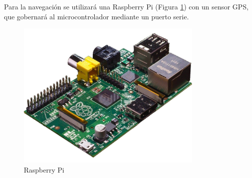 \documentclass[12pt,twoside]{article}
\begin{document}
		Para la navegación se utilizará una Raspberry Pi (Figura \ref{fig:raspberry_pi}) con un sensor GPS, que gobernará al microcontrolador mediante un puerto serie.
		\begin{figure}
					\centering
					\includegraphics[width=0.8\textwidth]{Imatges/Componentes/raspberry_pi.jpg}
					\caption{Raspberry Pi}
					\label{fig:raspberry_pi}
			\end{figure}
		
	
  
\end{document}

